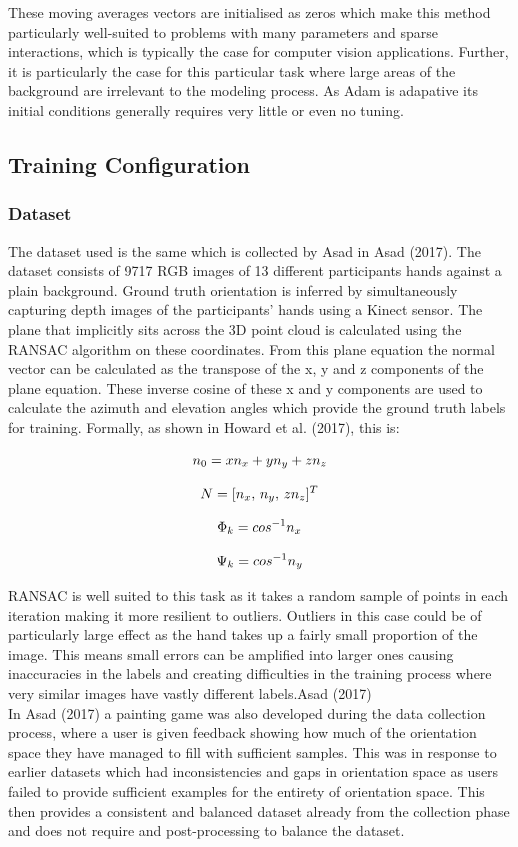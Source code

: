 \documentclass{article}
\begin{document}
These moving averages vectors are initialised as zeros which make this method particularly well-suited to problems with many parameters and sparse interactions, which is typically the case for computer vision applications. Further, it is particularly the case for this particular task where large areas of the background are irrelevant to the modeling process. As Adam is adapative its initial conditions generally requires very little or even no tuning.
\subsection{Training Configuration}
\subsubsection{Dataset}
The dataset used is the same which is collected by Asad in Asad (2017). The dataset consists of 9717 RGB images of 13 different participants hands against a plain background. Ground truth orientation is inferred by simultaneously capturing depth images of the participants' hands using a Kinect sensor. The plane that implicitly sits across the 3D point cloud is calculated using the RANSAC algorithm on these coordinates. From this plane equation the normal vector can be calculated as the transpose of the x, y and z components of the plane equation. These inverse cosine of these x and y components are used to calculate the azimuth and elevation angles which provide the ground truth labels for training. Formally, as shown in Howard et al. (2017), this is:

\[\emph{$n_{0}$} =  \emph{$xn_{x}$} + \emph{$yn_{y}$} + \emph{$zn_{z}$}\]

\[\emph{$N$} =  [\emph{$n_{x}$},\, \emph{$n_{y}$},\, \emph{$zn_{z}$}]^T\]

\[\emph{$\Phi_{k}$} =  \emph{$cos^{-1}n_{x}$}\]

\[\emph{$\Psi_{k}$} =  \emph{$cos^{-1}n_{y}$}\]

RANSAC is well suited to this task as it takes a random sample of points in each iteration making it more resilient to outliers. Outliers in this case could be of particularly large effect as the hand takes up a fairly small proportion of the image. This means small errors can be amplified into larger ones causing inaccuracies in the labels and creating difficulties in the training process where very similar images have vastly different labels.Asad (2017)\\

In Asad (2017) a painting game was also developed during the data collection process, where a user is given feedback showing how much of the orientation space they have managed to fill with sufficient samples. This was in response to earlier datasets which had inconsistencies and gaps in orientation space as users failed to provide sufficient examples for the entirety of orientation space. This then provides a consistent and balanced dataset already from the collection phase and does not require and post-processing to balance the dataset.
\end{document}
